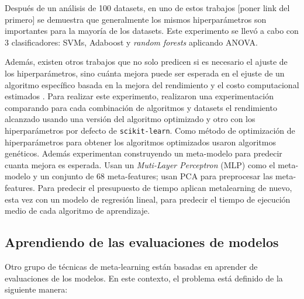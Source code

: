 Después de un análisis de 100 datasets, en uno de estos trabajos [poner link del primero] se demuestra que generalmente los mismos hiperparámetros son importantes para la mayoría de los datasets. Este experimento se llevó a cabo con 3 clasificadores: SVMs, Adaboost y \textit{random forests} aplicando ANOVA.

Además, existen otros trabajos que no solo predicen si es necesario el ajuste de los hiperparámetros, sino cuánta mejora puede ser esperada en el ejuste de un algoritmo específico basada en la mejora del rendimiento y el costo computacional estimados \cite{sanders2017informing}. Para realizar este experimento, realizaron una experimentación comparando para cada combinación de algoritmos y datasets el rendimiento alcanzado usando una versión del algoritmo optimizado y otro con los hiperparámetros por defecto de \texttt{scikit-learn}. Como método de optimización de hiperparámetros para obtener los algoritmos optimizados usaron algoritmos genéticos. Además experimentan construyendo un meta-modelo para predecir cuanta mejora es esperada. Usan un \textit{Muti-Layer Perceptron} (MLP) como el meta-modelo y un conjunto de 68 meta-features; usan PCA para preprocesar las meta-features. Para predecir el presupuesto de tiempo aplican metalearning de nuevo, esta vez con un modelo de regresión lineal, para predecir el tiempo de ejecución medio de cada algoritmo de aprendizaje.


%

\subsection{Aprendiendo de las evaluaciones de modelos}\label{subsec:mtl_automl_evaluations}

Otro grupo de técnicas de meta-learning están basadas en aprender de evaluaciones de los modelos. En este contexto, el problema está definido de la siguiente manera:

